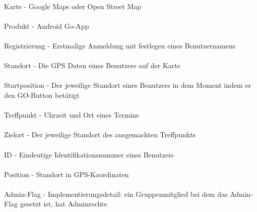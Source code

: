 \\
Karte - Google Maps oder Open Street Map\\
\\
Produkt - Android Go-App\\
\\
Registrierung - Erstmalige Anmeldung mit festlegen eines Benutzernamens\\
\\
Standort - Die GPS Daten eines Benutzers auf der Karte\\
\\
Startposition - Der jeweilige Standort eines Benutzers in dem Moment indem er den GO-Button betätigt\\
\\
Treffpunkt - Uhrzeit und Ort eines Termins\\
\\
Zielort - Der jeweilige Standort des ausgemachten Treffpunkts\\
\\
ID - Eindeutige Identifikationsnummer eines Benutzers\\
\\
Position - Standort in GPS-Koordinaten\\
\\
Admin-Flag - Implementierungsdetail: ein Gruppenmitglied bei dem das Admin-Flag gesetzt ist, hat Adminrechte\\
\\

